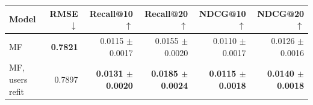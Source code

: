 \begin{tabular}{lrrrrr}
\toprule
Model & RMSE $\downarrow$ & Recall@10 $\uparrow$ & Recall@20 $\uparrow$ & NDCG@10 $\uparrow$ & NDCG@20 $\uparrow$ \\
\midrule
MF & \textbf{0.7821} & 0.0115 $\pm$ 0.0017 & 0.0155 $\pm$ 0.0020 & 0.0110 $\pm$ 0.0017 & 0.0126 $\pm$ 0.0016 \\
MF, users refit & 0.7897 & \textbf{0.0131 $\pm$ 0.0020} & \textbf{0.0185 $\pm$ 0.0024} & \textbf{0.0115 $\pm$ 0.0018} & \textbf{0.0140 $\pm$ 0.0018} \\
\bottomrule
\end{tabular}
